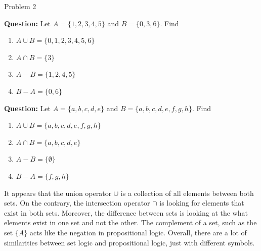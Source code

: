 \begin{problem}{Problem 2}
    \begin{highlight}[Solution - \#3]
        \noindent \textbf{Question:} Let $A = \{ 1, 2, 3, 4, 5\}$ and $B = \{ 0, 3, 6\}$. Find

        \begin{enumerate}[label=(\alph*)]
            \item $A \cup B = \{0,1,2,3,4,5,6\}$
            \item $A \cap B = \{3\}$
            \item $A - B = \{1,2,4,5\}$
            \item $B - A = \{0,6\}$
        \end{enumerate}
    \end{highlight}

    \begin{highlight}[Solution - \#4]
        \noindent \textbf{Question:} Let $A = \{ a, b, c, d, e\}$ and $B = \{ a, b, c, d, e, f, g, h\}$. Find

        \begin{enumerate}[label=(\alph*)]
            \item $A \cup B = \{a,b,c,d,e,f,g,h\}$
            \item $A \cap B = \{a,b,c,d,e\}$
            \item $A - B = \{\emptyset\}$
            \item $B - A = \{f,g,h\}$
        \end{enumerate}
    \end{highlight}

    \begin{highlight}[Insights]
        It appears that the union operator $\cup$ is a collection of all elements between both sets. On the contrary, the intersection operator $\cap$ is looking for elements that exist in both sets.
        Moreover, the difference between sets is looking at the what elements exist in one set and not the other. The complement of a set, such as the set $\{A\}$ acts like the negation in propositional
        logic. Overall, there are a lot of similarities between set logic and propositional logic, just with different symbols.
    \end{highlight}
\end{problem}

